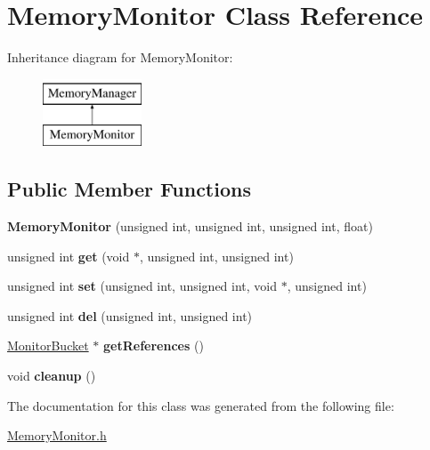 \hypertarget{classMemoryMonitor}{\section{\-Memory\-Monitor \-Class \-Reference}
\label{classMemoryMonitor}
}
\-Inheritance diagram for \-Memory\-Monitor\-:\begin{figure}[H]
\begin{center}
\leavevmode
\includegraphics[height=2.000000cm]{classMemoryMonitor}
\end{center}
\end{figure}
\subsection*{\-Public \-Member \-Functions}
\begin{DoxyCompactItemize}
\item 
\hypertarget{classMemoryMonitor_a35fa8d9d50c1a3a0b7295c26dd97e4c9}{{\bfseries \-Memory\-Monitor} (unsigned int, unsigned int, unsigned int, float)}\label{classMemoryMonitor_a35fa8d9d50c1a3a0b7295c26dd97e4c9}

\item 
\hypertarget{classMemoryMonitor_a1238d10b5e3ddc1c81fcd4ce7af698ab}{unsigned int {\bfseries get} (void $\ast$, unsigned int, unsigned int)}\label{classMemoryMonitor_a1238d10b5e3ddc1c81fcd4ce7af698ab}

\item 
\hypertarget{classMemoryMonitor_a57b86aac696c79f2c3018ee9878e15a3}{unsigned int {\bfseries set} (unsigned int, unsigned int, void $\ast$, unsigned int)}\label{classMemoryMonitor_a57b86aac696c79f2c3018ee9878e15a3}

\item 
\hypertarget{classMemoryMonitor_a6ebe27bc008fb68397d9f400c0745c5d}{unsigned int {\bfseries del} (unsigned int, unsigned int)}\label{classMemoryMonitor_a6ebe27bc008fb68397d9f400c0745c5d}

\item 
\hypertarget{classMemoryMonitor_a80afff1cac8638d1ae8db3a5a0e70a26}{\hyperlink{structmonitorbucket}{\-Monitor\-Bucket} $\ast$ {\bfseries get\-References} ()}\label{classMemoryMonitor_a80afff1cac8638d1ae8db3a5a0e70a26}

\item 
\hypertarget{classMemoryMonitor_ac31e19cbcae35d0fb865c3380f355e37}{void {\bfseries cleanup} ()}\label{classMemoryMonitor_ac31e19cbcae35d0fb865c3380f355e37}

\end{DoxyCompactItemize}


\-The documentation for this class was generated from the following file\-:\begin{DoxyCompactItemize}
\item 
\hyperlink{MemoryMonitor_8h}{\-Memory\-Monitor.\-h}\end{DoxyCompactItemize}
